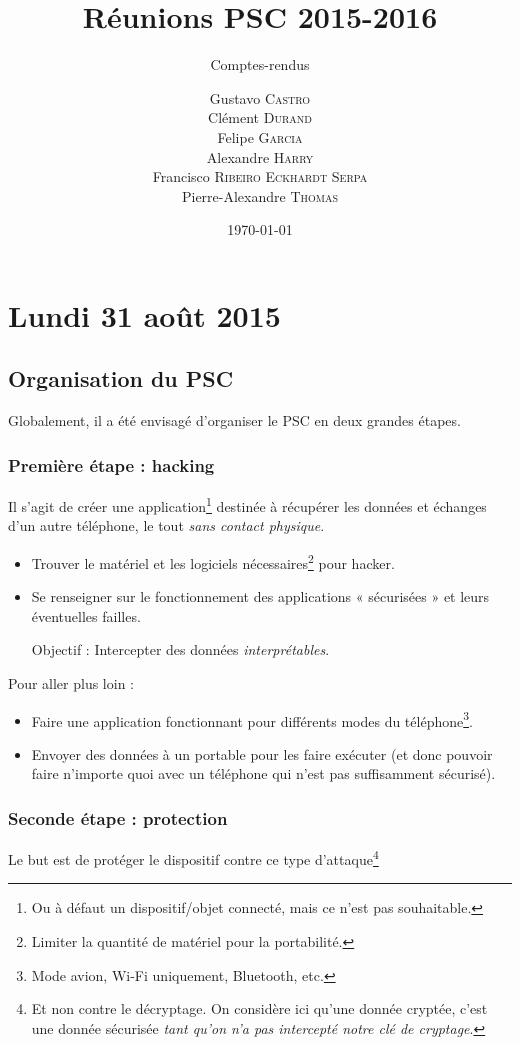 \documentclass[a4paper, 11pt]{article}
\title{Réunions PSC 2015-2016}
\author{Gustavo \textsc{Castro} \\
		Clément \textsc{Durand} \\
		Felipe \textsc{Garcia} \\
		Alexandre \textsc{Harry} \\
		Francisco \textsc{Ribeiro Eckhardt Serpa} \\
		Pierre-Alexandre \textsc{Thomas}}
\subtitle{Comptes-rendus}
\date{\today}
\begin{document}
\maketitle
\tableofcontents\clearpage

\section{Lundi 31 août 2015}

\subsection{Organisation du PSC}
Globalement, il a été envisagé d'organiser le PSC en deux grandes étapes.
\subsubsection{Première étape : hacking}
Il s'agit de créer une application\footnote{Ou à défaut un dispositif/objet connecté, mais ce n'est pas souhaitable.} destinée à récupérer les données et échanges d'un autre téléphone, le tout \emph{sans contact physique}.

\begin{itemize}
	\item Trouver le matériel et les logiciels nécessaires\footnote{Limiter la quantité de matériel pour la portabilité.} pour hacker.
	\item Se renseigner sur le fonctionnement des applications « sécurisées » et leurs éventuelles failles.
	\item[Objectif :] Intercepter des données \emph{interprétables}.
\end{itemize}

Pour aller plus loin :
\begin{itemize}
	\item Faire une application fonctionnant pour différents modes du téléphone\footnote{Mode avion, Wi-Fi uniquement, Bluetooth, etc.}.
	\item Envoyer des données à un portable pour les faire exécuter (et donc pouvoir faire n'importe quoi avec un téléphone qui n'est pas suffisamment sécurisé).
\end{itemize}

\subsubsection{Seconde étape : protection}
Le but est de protéger le dispositif contre ce type d'attaque\footnote{Et non contre le décryptage. On considère ici qu'une donnée cryptée, c'est une donnée sécurisée \emph{tant qu'on n'a pas intercepté notre clé de cryptage}.}
\end{document}
